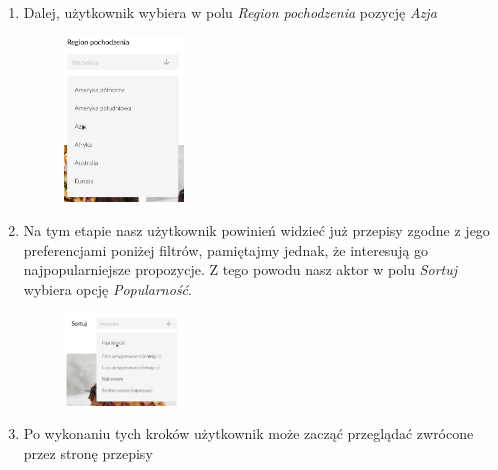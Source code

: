 \documentclass{article}
\begin{document}
\begin{enumerate}
\begin{figure}[H]
\begin{center}
            \end{center}
        \end{figure}
    \newpage    
    \item Dalej, użytkownik wybiera w polu \textit{Region pochodzenia} pozycję \textit{Azja}
        \begin{figure}[H]
            \begin{center}
                \includegraphics[width=0.3\textwidth]{images/find_recipe_step7}
            \end{center}
        \end{figure}
    \item Na tym etapie nasz użytkownik powinień widzieć już przepisy zgodne z jego preferencjami poniżej filtrów, pamiętajmy jednak, że interesują go najpopularniejsze propozycje.
        Z tego powodu nasz aktor w polu \textit{Sortuj} wybiera opcję \textit{Popularność}.
        \begin{figure}[H]
            \begin{center}
                \includegraphics[width=0.3\textwidth]{images/find_recipe_step8}
            \end{center}
        \end{figure}
    \item Po wykonaniu tych kroków użytkownik może zacząć przeglądać zwrócone przez stronę przepisy
\end{enumerate}

\newpage
\end{document}
